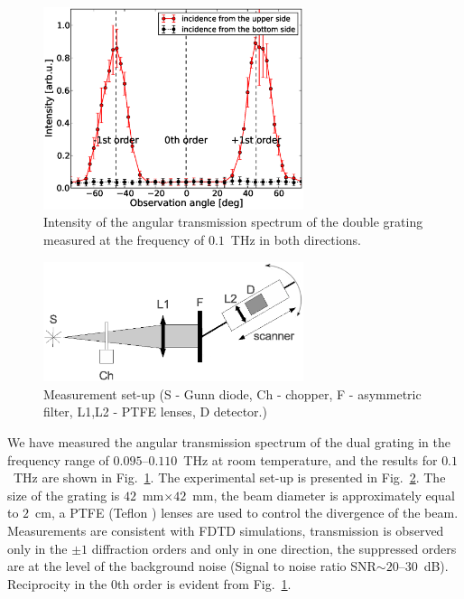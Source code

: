 \documentclass[10pt,letterpaper,twocolumn]{article} %
\begin{document}
\begin{figure}
 \begin{center} 
 \includegraphics[width=3in]{fig4.eps}
\end{center}
\caption{Intensity of the angular transmission spectrum  of the double grating measured at the frequency of $0.1$~THz in both directions. \label{fig.experim}}
\end{figure} 

\begin{figure}
 \begin{center}
 \includegraphics[width=3in]{fig5.eps}
\end{center}
\caption{Measurement set-up (S - Gunn diode, Ch - chopper, F - asymmetric filter, L1,L2 - PTFE lenses, D detector.)\label{fig.setup}}
\end{figure} 

We have measured the angular transmission spectrum of the dual grating in the frequency range of $0.095$--$0.110$~THz at room temperature, and the results for $0.1$~THz are shown in Fig.~\ref{fig.experim}. The experimental set-up is presented in Fig.~\ref{fig.setup}. The size of the grating is $42$~mm$\times 42$~mm,  the beam diameter is approximately equal to $2$~cm, a PTFE (Teflon \texttrademark) lenses are used to control the divergence of the beam. Measurements are consistent with FDTD simulations, transmission is observed only in the $\pm1$ diffraction orders and only in one direction, the suppressed  orders are at the level of the background noise (Signal to noise ratio SNR$\sim20$--$30$~dB). Reciprocity in the 0th order is evident from Fig.~\ref{fig.experim}. 
\end{document}
